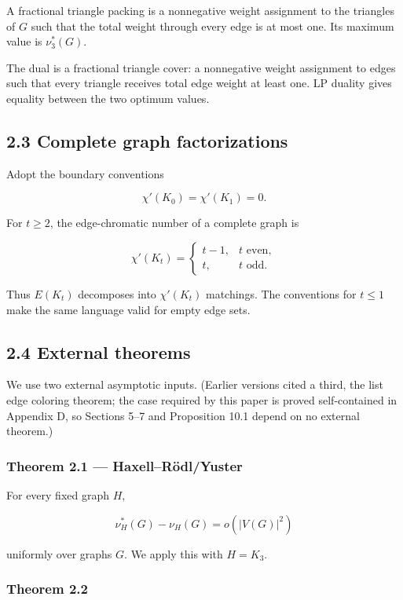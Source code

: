 \documentclass[
  11pt,
]{article}
\begin{document}
A fractional triangle packing is a nonnegative weight assignment to the
triangles of \(G\) such that the total weight through every edge is at
most one. Its maximum value is \(\nu_3^*(G)\).

The dual is a fractional triangle cover: a nonnegative weight assignment
to edges such that every triangle receives total edge weight at least
one. LP duality gives equality between the two optimum values.

\subsection{2.3 Complete graph
factorizations}\label{complete-graph-factorizations}

Adopt the boundary conventions

\[
\chi'(K_0)=\chi'(K_1)=0.
\]

For \(t\ge2\), the edge-chromatic number of a complete graph is

\[
\chi'(K_t)
=
\begin{cases}
t-1,&t\text{ even},\\
t,&t\text{ odd}.
\end{cases}
\tag{2.2}
\]

Thus \(E(K_t)\) decomposes into \(\chi'(K_t)\) matchings. The
conventions for \(t\le1\) make the same language valid for empty edge
sets.

\subsection{2.4 External theorems}\label{external-theorems}

We use two external asymptotic inputs. (Earlier versions cited a third,
the list edge coloring theorem; the case required by this paper is
proved self-contained in Appendix D, so Sections 5--7 and Proposition
10.1 depend on no external theorem.)

\subsubsection{Theorem 2.1 ---
Haxell--Rödl/Yuster}\label{theorem-2.1-haxellruxf6dlyuster}

For every fixed graph \(H\),

\[
\nu_H^*(G)-\nu_H(G)=o(|V(G)|^2)
\]

uniformly over graphs \(G\). We apply this with \(H=K_3\).

\subsubsection{Theorem 2.2}\label{theorem-2.2-list-edge-coloring-proved-in-appendix-d}
\end{document}

